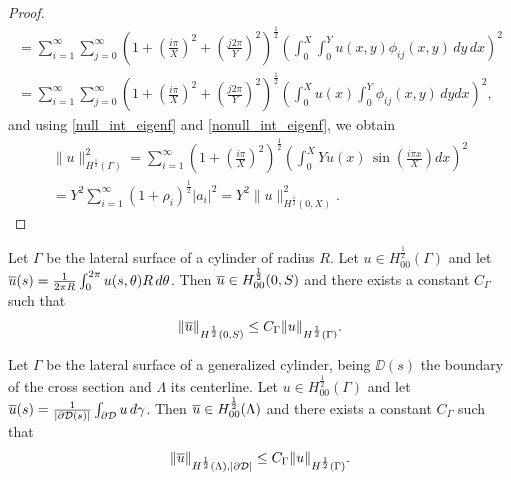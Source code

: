 \documentclass[r]{siamart171218}
\begin{document}
\begin{proof}
\begin{multline*}
=\sum_{i=1}^{\infty}\sum_{j=0}^{\infty} \left(  1+ \left(\frac{i\pi}{X}\right)^2 + \left(\frac{j2\pi}{Y}\right)^2\right)^{\frac 12}\left( \int _0^X\int _0^Y u(x,y )\phi_{ij}(x,y) \,dy\,dx \right)^2\\
=\sum_{i=1}^{\infty}\sum_{j=0}^{\infty} \left(  1+ \left(\frac{i\pi}{X}\right)^2 + \left(\frac{j2\pi}{Y}\right)^2\right)^{\frac 12}\left( \int _0^X u(x) \int _0^Y \phi_{ij}(x,y)\,  dy dx \right)^2,
\end{multline*}
and using \eqref{null_int_eigenf} and \eqref{nonull_int_eigenf}, we obtain
\begin{multline*}
\|u\|^2_{H^{\frac 12}(\Gamma)}=
\sum_{i=1}^{\infty}\left( 1+ \left(\frac{i\pi}{X}\right)^2\right)^{\frac 12}\left(\int _0^X Yu(x)\, \sin\left(\frac{i\pi x}{X}\right) dx\right)^2\\
=Y^2 \sum_{i=1}^{\infty}\left( 1+ \rho _i\right)^{\frac 12}|a_i|^2 = Y^2  \|u\|^2_{H^{\frac 12}(0,X)}.
\end{multline*}
\end{proof}


\begin{corollary}
Let $\Gamma$ be the lateral surface of a cylinder of radius $R$. Let $u\in H^{\frac 12}_{00}(\Gamma)$ and let $\overline{u}(s)= \frac{1}{2\pi R} \int_0^{2\pi} u(s,\theta)R\, d\theta$. Then $\overline{u}\in H^{\frac 12}_{00}(0,S)$ and there exists a constant $C_\Gamma$ such that
\begin{equation*}
\|\overline{u}\|_{H^{\frac 12}(0,S)} \leq C_\Gamma \|u\|_{H^{\frac 12}(\Gamma)}.
\end{equation*}
\end{corollary}

\begin{corollary}
Let $\Gamma$ be the lateral surface of a generalized cylinder, being $\DD(s)$ the boundary of the cross section and $\Lambda$ its centerline. Let $u\in H^{\frac 12}_{00}(\Gamma)$ and let $\overline{u}(s)= \frac{1}{|\partial\mathcal{D}(s)|} \int_{\partial\mathcal{D}} u \,d\gamma$. Then $\overline{u}\in H^{\frac 12}_{00}(\Lambda)$  and there exists a constant $C_\Gamma$ such that
\begin{equation*}
\|\overline{u}\|_{H^{\frac 12}(\Lambda), |\partial\mathcal{D}|} \leq C_\Gamma \|u\|_{H^{\frac 12}(\Gamma)}.
\end{equation*}
\end{corollary}
\end{document}
